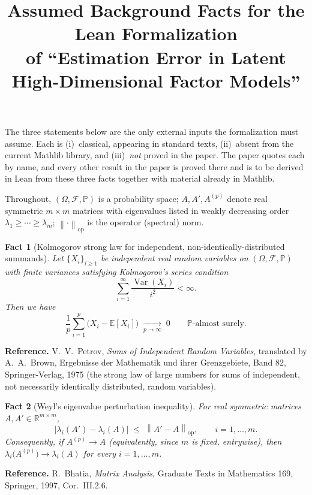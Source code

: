 \documentclass[11pt]{article}
\title{Assumed Background Facts for the Lean Formalization\\
of ``Estimation Error in Latent High-Dimensional Factor Models''}
\author{}
\date{}
\newtheorem{fact}{Fact}
\newcommand{\R}{\mathbb{R}}
\newcommand{\E}{\mathbb{E}}
\newcommand{\PP}{\mathbb{P}}
\newcommand{\Var}{\operatorname{Var}}
\newcommand{\opnorm}[1]{\left\lVert #1 \right\rVert_{\mathrm{op}}}
\newcommand{\lam}{\lambda}
\begin{document}
\maketitle

\noindent
The three statements below are the only external inputs the formalization
must assume. Each is (i)~classical, appearing in standard texts, (ii)~absent
from the current Mathlib library, and (iii)~\emph{not} proved in the paper. The
paper quotes each by name, and every other result in the paper
is proved there and is to be derived in Lean from these three facts together with material already
in Mathlib.

Throughout, $(\Omega,\mathcal F,\PP)$ is a probability space; $A,A',A^{(p)}$
denote real symmetric $m\times m$ matrices with eigenvalues listed in weakly
decreasing order $\lam_1\ge\cdots\ge\lam_m$; $\opnorm{\cdot}$ is the operator
(spectral) norm.

\bigskip

\begin{fact}[Kolmogorov strong law for independent, non-identically-distributed summands]
\label{Fact1}
Let $\{X_i\}_{i\ge 1}$ be independent real random variables on
$(\Omega,\mathcal F,\PP)$ with finite variances satisfying Kolmogorov's series
condition
\[
  \sum_{i=1}^{\infty}\frac{\Var(X_i)}{i^{2}} < \infty .
\]
Then we have
\[
  \frac{1}{p}\sum_{i=1}^{p}\bigl(X_i-\E[X_i]\bigr)
  \;\xrightarrow[p\to\infty]{}\; 0
  \qquad \PP\text{-almost surely.}
\]
\end{fact}


\medskip
\noindent\textbf{Reference.} V.~V.~Petrov, \emph{Sums of Independent Random
Variables}, translated by A.~A.~Brown, Ergebnisse der Mathematik und ihrer
Grenzgebiete, Band 82, Springer-Verlag, 1975 (the strong law of large numbers
for sums of independent, not necessarily identically distributed, random
variables).

\bigskip

\begin{fact}[Weyl's eigenvalue perturbation inequality]
\label{Fact2}
For real symmetric matrices $A, A' \in \R^{m\times m}$,
\[
  \bigl\lvert \lam_i(A') - \lam_i(A) \bigr\rvert \;\le\; \opnorm{A' - A},
  \qquad i = 1,\dots,m .
\]
Consequently, if $A^{(p)}\to A$ (equivalently, since $m$ is fixed, entrywise),
then $\lam_i\bigl(A^{(p)}\bigr)\to\lam_i(A)$ for every $i=1,\dots,m$.
\end{fact}



\medskip
\noindent\textbf{Reference.} R.~Bhatia, \emph{Matrix Analysis}, Graduate Texts
in Mathematics 169, Springer, 1997, Cor.~III.2.6.
\end{document}
